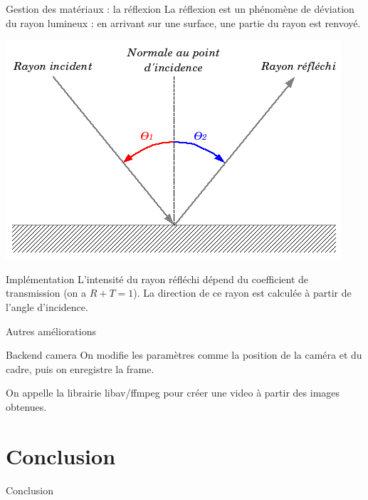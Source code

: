 \documentclass{beamer}
\begin{document}
\begin{frame}{Gestion des matériaux : la réflexion}
La réflexion est un phénomène de déviation du rayon lumineux : en arrivant sur
une surface, une partie du rayon est renvoyé.

\begin{center}
  \includegraphics[scale=0.4]{img/introduction.png}
\end{center}

\begin{block}{Implémentation}
L'intensité du rayon réfléchi dépend du coefficient de transmission (on a
$R+T=1$). La direction de ce rayon est calculée à partir de l'angle d'incidence.
\end{block}
\end{frame}

\begin{frame}{Autres améliorations}
\begin{block}{Backend camera}
On modifie les paramètres comme la position de la caméra et du cadre, puis on enregistre la frame.

On appelle la librairie libav/ffmpeg pour créer une video à partir des images obtenues.
\end{block}
\end{frame}

\section{Conclusion}
\begin{frame}{Conclusion}
\end{frame}
\end{document}
